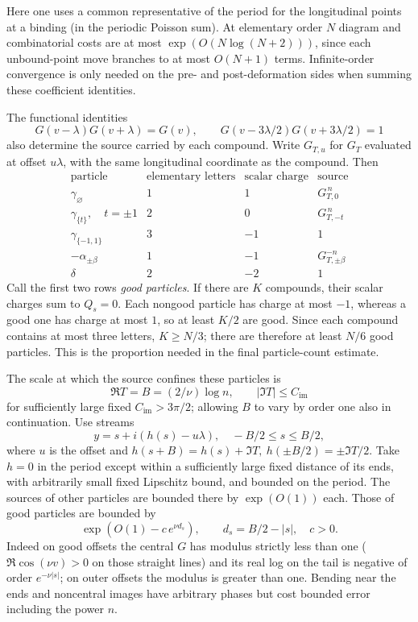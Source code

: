Here one uses a common representative of the period for the longitudinal points at a binding (in the periodic Poisson sum). At elementary order \(N\) diagram and combinatorial costs are at most \(\exp(O(N\log(N+2)))\), since each unbound-point move branches to at most \(O(N+1)\) terms. Infinite-order convergence is only needed on the pre- and post-deformation sides when summing these coefficient identities.

The functional identities
\[
 G(v-\lambda)G(v+\lambda)=G(v),\qquad
 G(v-3\lambda/2)G(v+3\lambda/2)=1
\]
also determine the source carried by each compound. Write \(G_{T,u}\)
for \(G_T\) evaluated at offset \(u\lambda\), with the same
longitudinal coordinate as the compound. Then
\[
\begin{array}{c|c|c|c}
\text{particle}&\text{elementary letters}&\text{scalar charge}&\text{source}\\ \hline
\gamma_\varnothing&1&1&G_{T,0}^{\,n}\\
\gamma_{\{t\}},\quad t=\pm1&2&0&G_{T,-t}^{\,n}\\
\gamma_{\{-1,1\}}&3&-1&1\\
-\alpha_{\pm\beta}&1&-1&G_{T,\pm\beta}^{-n}\\
\delta&2&-2&1
\end{array}
\]
Call the first two rows \emph{good particles}. If there are \(K\)
compounds, their scalar charges sum to \(Q_s=0\). Each nongood
particle has charge at most \(-1\), whereas a good one has charge at
most \(1\), so at least \(K/2\) are good. Since each compound contains
at most three letters, \(K\ge N/3\); there are therefore at least
\(N/6\) good particles. This is the proportion needed in the final
particle-count estimate.

The scale at which the source confines these particles is
\begin{equation}
 \Re T=B=(2/\nu)\log n,\qquad |\Im T|\le C_{\mathrm{im}}                              \label{c2:eq-V6}
\end{equation}
for sufficiently large fixed \(C_{\mathrm{im}}>3\pi/2\); allowing \(B\) to vary by order one also in continuation. Use streams
\[
 y=s+i(h(s)-u\lambda),\quad -B/2\le s\le B/2,
\]
where \(u\) is the offset and \(h(s+B)=h(s)+\Im T,\ h(\pm B/2)=\pm\Im T/2\). Take \(h=0\) in the period except within a sufficiently large fixed distance of its ends, with arbitrarily small fixed Lipschitz bound, and bounded on the period. The sources of other particles are bounded there by \(\exp(O(1))\) each. Those of good particles are bounded by
\[
 \exp(O(1)-c\,e^{\nu d_s}),\qquad d_s=B/2-|s|,\quad c>0.
\]
Indeed on good offsets the central \(G\) has modulus strictly less than one (\(\Re\cos(\nu v)>0\) on those straight lines) and its real log on the tail is negative of order \(e^{-\nu|s|}\); on outer offsets the modulus is greater than one. Bending near the ends and noncentral images have arbitrary phases but cost bounded error including the power \(n\).

